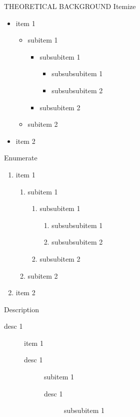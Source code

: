 \documentclass[a0paper,portrait]{baposter}
\begin{document}
\begin{poster}
\begin{posterbox}[name=lists,column=0,below=usage]{THEORETICAL BACKGROUND}
Itemize
\begin{itemize}
  \item item 1
    \begin{itemize}
      \item subitem 1
        \begin{itemize}
          \item subsubitem 1
            \begin{itemize}
              \item subsubsubitem 1
              \item subsubsubitem 2
            \end{itemize}
          \item subsubitem 2
        \end{itemize}
      \item subitem 2
    \end{itemize}
  \item item 2
\end{itemize}
Enumerate
\begin{enumerate}
  \item item 1
    \begin{enumerate}
      \item subitem 1
        \begin{enumerate}
          \item subsubitem 1
            \begin{enumerate}
              \item subsubsubitem 1
              \item subsubsubitem 2
            \end{enumerate}
          \item subsubitem 2
        \end{enumerate}
      \item subitem 2
    \end{enumerate}
  \item item 2
\end{enumerate}
Description
\begin{description}
  \item[desc 1] item 1
    \begin{description}
      \item[desc 1] subitem 1
        \begin{description}
          \item[desc 1] subsubitem 1
            \begin{description}

\end{description}
\end{description}
\end{description}
\end{description}
\end{posterbox}
\end{poster}
\end{document}
